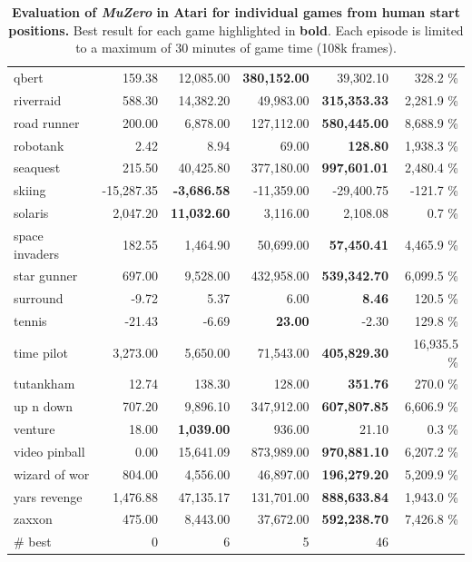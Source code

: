 \documentclass{article}
\newcommand{\muzero}{\emph{MuZero}}
\begin{document}
\begin{table}
\begin{center}
\begin{tabularx}{0.750000\textwidth}{X| r r r r r}
qbert &159.38 & 12,085.00 & \textbf{380,152.00} & 39,302.10 & 328.2 \%\\
riverraid &588.30 & 14,382.20 & 49,983.00 & \textbf{315,353.33} & 2,281.9 \%\\
road runner &200.00 & 6,878.00 & 127,112.00 & \textbf{580,445.00} & 8,688.9 \%\\
robotank &2.42 & 8.94 & 69.00 & \textbf{128.80} & 1,938.3 \%\\
seaquest &215.50 & 40,425.80 & 377,180.00 & \textbf{997,601.01} & 2,480.4 \%\\
skiing &-15,287.35 & \textbf{-3,686.58} & -11,359.00 & -29,400.75 & -121.7 \%\\
solaris &2,047.20 & \textbf{11,032.60} & 3,116.00 & 2,108.08 & 0.7 \%\\
space invaders &182.55 & 1,464.90 & 50,699.00 & \textbf{57,450.41} & 4,465.9 \%\\
star gunner &697.00 & 9,528.00 & 432,958.00 & \textbf{539,342.70} & 6,099.5 \%\\
surround &-9.72 & 5.37 & 6.00 & \textbf{8.46} & 120.5 \%\\
tennis &-21.43 & -6.69 & \textbf{23.00} & -2.30 & 129.8 \%\\
time pilot &3,273.00 & 5,650.00 & 71,543.00 & \textbf{405,829.30} & 16,935.5 \%\\
tutankham &12.74 & 138.30 & 128.00 & \textbf{351.76} & 270.0 \%\\
up n down &707.20 & 9,896.10 & 347,912.00 & \textbf{607,807.85} & 6,606.9 \%\\
venture &18.00 & \textbf{1,039.00} & 936.00 & 21.10 & 0.3 \%\\
video pinball &0.00 & 15,641.09 & 873,989.00 & \textbf{970,881.10} & 6,207.2 \%\\
wizard of wor &804.00 & 4,556.00 & 46,897.00 & \textbf{196,279.20} & 5,209.9 \%\\
yars revenge &1,476.88 & 47,135.17 & 131,701.00 & \textbf{888,633.84} & 1,943.0 \%\\
zaxxon &475.00 & 8,443.00 & 37,672.00 & \textbf{592,238.70} & 7,426.8 \%\\
\midrule
\# best & 0 & 6 & 5 & 46\\
\bottomrule
\end{tabularx}
\end{center}


\caption{
\label{tab:atari-results-at30-rnd-starts}
\textbf{Evaluation of \muzero{} in Atari for individual games from human start positions.} Best result for each game highlighted in \textbf{bold}.  Each episode is limited to a maximum of 30 minutes of game time (108k frames).
}
\end{table}
\end{document}
